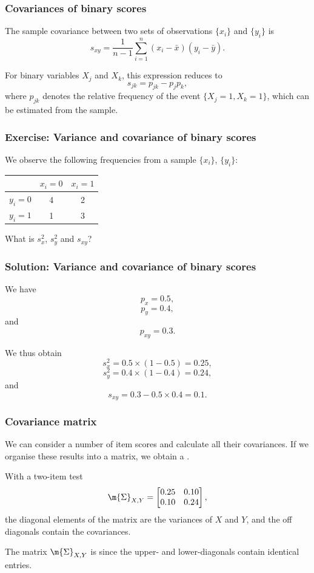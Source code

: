 \documentclass[compress]{beamer}\usepackage[]{graphicx}\usepackage[]{xcolor}
\begin{document}
\begin{frame}[fragile]
  \frametitle{Covariances of binary scores}
    The sample covariance between two sets of observations $\{x_i\}$ and $\{y_i\}$ is
      \[ s_{xy} = \frac{1}{n - 1} \sum_{i=1}^n(x_i - \bar{x})(y_i - \bar{y}). \]

    For binary variables $X_j$ and $X_k$, this expression reduces to 
      \[ s_{jk} = p_{jk} - p_jp_k, \]
    where $p_{jk}$ denotes the relative frequency of the event $\{X_j = 1, X_k = 1\}$, which can be estimated from the sample.
\end{frame}


\begin{frame}[fragile]
    \frametitle{Exercise: Variance and covariance of binary scores}
      We observe the following frequencies from a sample $\{x_i\}$, $\{y_i\}$:

      \begin{center}
        \begin{tabular}{|c|c|c|}
          \hline
          & $x_i = 0$ & $x_i = 1$\\
          \hline
          $y_i = 0$ & 4 & 2 \\
          \hline
          $y_i = 1$ & 1 & 3 \\
          \hline
        \end{tabular}
      \end{center}

    What is $s_x^2$, $s_y^2$ and $s_{xy}$?
\end{frame}

\begin{frame}[fragile]
  \frametitle{Solution: Variance and covariance of binary scores}
    We have
      \[ p_x = 0.5, \]
      \[ p_y = 0.4, \]
    and 
      \[ p_{xy} = 0.3. \]

    We thus obtain
    \[ s_x^2 = 0.5 \times (1 - 0.5) = 0.25, \]
    \[ s_y^2 = 0.4 \times (1 - 0.4) = 0.24, \]
    and
    \[ s_{xy} = 0.3 - 0.5 \times 0.4 = 0.1. \]
\end{frame}


\begin{frame}[fragile]
  \frametitle{Covariance matrix}
    We can consider a number of item scores and calculate all their covariances. If we organise these results into a matrix, we obtain a .

    With a two-item test
      \begin{equation*}
        \m{\Sigma}_{X,Y} =
          \begin{bmatrix}
            0.25  &0.10\\
            0.10  &0.24
          \end{bmatrix},
    \end{equation*}
    the diagonal elements of the matrix are the variances of $X$ and $Y$, and the off diagonals contain the covariances.

    The matrix $\m{\Sigma}_{X,Y}$ is  since the upper- and lower-diagonals contain identical entries.
\end{frame}
\end{document}
